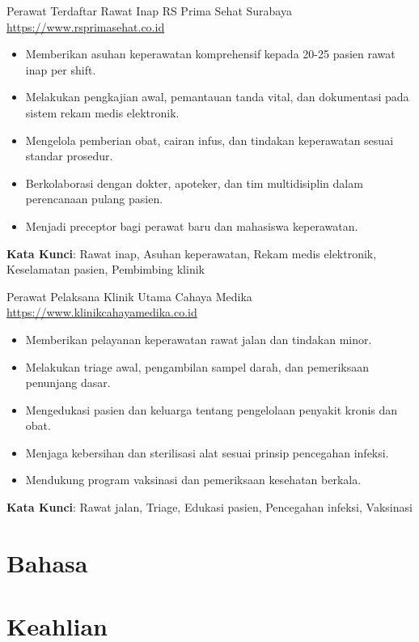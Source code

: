 \documentclass[a4paper, serif, 10pt]{moderncv}
\begin{document}
        {Perawat Terdaftar Rawat Inap}
        {RS Prima Sehat Surabaya}
        {\url{https://www.rsprimasehat.co.id}}
        {}
        {\begin{itemize}
\item Memberikan asuhan keperawatan komprehensif kepada 20-25 pasien rawat inap per shift.
\item Melakukan pengkajian awal, pemantauan tanda vital, dan dokumentasi pada sistem rekam medis elektronik.
\item Mengelola pemberian obat, cairan infus, dan tindakan keperawatan sesuai standar prosedur.
\item Berkolaborasi dengan dokter, apoteker, dan tim multidisiplin dalam perencanaan pulang pasien.
\item Menjadi preceptor bagi perawat baru dan mahasiswa keperawatan.
\end{itemize}
\textbf{Kata Kunci}: Rawat inap, Asuhan keperawatan, Rekam medis elektronik, Keselamatan pasien, Pembimbing klinik}

        {Perawat Pelaksana}
        {Klinik Utama Cahaya Medika}
        {\url{https://www.klinikcahayamedika.co.id}}
        {}
        {\begin{itemize}
\item Memberikan pelayanan keperawatan rawat jalan dan tindakan minor.
\item Melakukan triage awal, pengambilan sampel darah, dan pemeriksaan penunjang dasar.
\item Mengedukasi pasien dan keluarga tentang pengelolaan penyakit kronis dan obat.
\item Menjaga kebersihan dan sterilisasi alat sesuai prinsip pencegahan infeksi.
\item Mendukung program vaksinasi dan pemeriksaan kesehatan berkala.
\end{itemize}
\textbf{Kata Kunci}: Rawat jalan, Triage, Edukasi pasien, Pencegahan infeksi, Vaksinasi}
\section{Bahasa}

\section{Keahlian}
\end{document}

